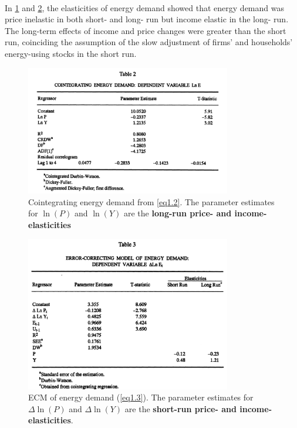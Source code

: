 \paragraph{}{In \cref{fig1.1} and \cref{fig1.2}, the elasticities of energy demand showed that energy demand was price inelastic in both short- and long- run but income elastic in the long- run. The long-term effects of income and price changes were greater than the short run, coinciding the assumption of the slow adjustment of firms' and households' energy-using stocks in the short run. }
\begin{figure}[h] %
	\centering
	\includegraphics[width=0.8\textwidth]{./figure/ch1/fig1.1_table2.png}
	\caption{Cointegrating energy demand from \cref{eq1.2}. The parameter estimates for $\ln(P)$ and $\ln(Y)$ are the \textbf{long-run price- and income- elasticities}}\label{fig1.1}
\end{figure}

\begin{figure}[h]  %
	\centering
	\includegraphics[width=0.8\textwidth]{./figure/ch1/fig1.2_table3.png}
	\caption{ECM of energy demand (\cref{eq1.3}). The parameter estimates for $\Delta \ln(P)$ and $\Delta \ln(Y)$ are the \textbf{short-run price- and income- elasticities}. }\label{fig1.2}
\end{figure}


